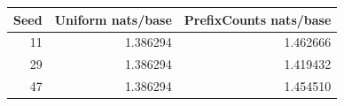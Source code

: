 \begin{tabular}{rrr}
\toprule Seed & Uniform nats/base & PrefixCounts nats/base \\
\midrule
11 & 1.386294 & 1.462666 \\
29 & 1.386294 & 1.419432 \\
47 & 1.386294 & 1.454510 \\
\bottomrule
\end{tabular}
